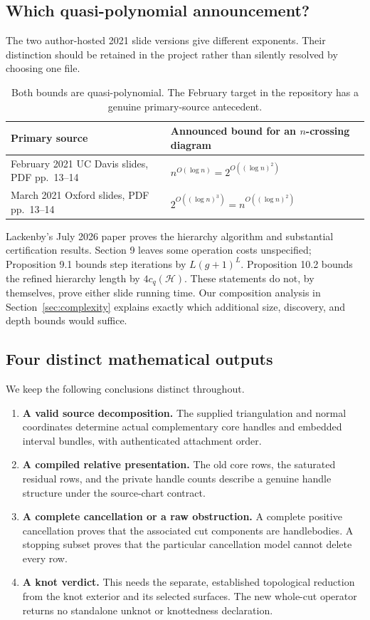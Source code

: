 \subsection{Which quasi-polynomial announcement?}

The two author-hosted 2021 slide versions give different exponents.  Their
distinction should be retained in the project rather than silently resolved
by choosing one file.

\begin{table}[htbp]
\centering\small
\begin{tabularx}{\linewidth}{@{}YX@{}}
\toprule
Primary source & Announced bound for an $n$-crossing diagram\\
\midrule
February 2021 UC Davis slides, PDF pp.\ 13--14\cite{lackenby2021feb}
& $n^{O(\log n)}=2^{O((\log n)^2)}$\\
March 2021 Oxford slides, PDF pp.\ 13--14\cite{lackenby2021mar}
& $2^{O((\log n)^3)}=n^{O((\log n)^2)}$\\
\bottomrule
\end{tabularx}
\caption{Both bounds are quasi-polynomial.  The February target in the
repository has a genuine primary-source antecedent.}
\end{table}

Lackenby's July 2026 paper\cite{lackenby2026} proves the hierarchy algorithm
and substantial certification results.  Section 9 leaves some operation
costs unspecified; Proposition 9.1 bounds step iterations by $L(g+1)^L$.
Proposition 10.2 bounds the refined hierarchy length by $4c_q(\mathcal H)$.
These statements do not, by themselves, prove either slide running time.
Our composition analysis in Section~\ref{sec:complexity} explains exactly
which additional size, discovery, and depth bounds would suffice.

\subsection{Four distinct mathematical outputs}

We keep the following conclusions distinct throughout.
\begin{enumerate}
\item \textbf{A valid source decomposition.}  The supplied triangulation and
normal coordinates determine actual complementary core handles and embedded
interval bundles, with authenticated attachment order.
\item \textbf{A compiled relative presentation.}  The old core rows, the
saturated residual rows, and the private handle counts describe a genuine
handle structure under the source-chart contract.
\item \textbf{A complete cancellation or a raw obstruction.}  A complete
positive cancellation proves that the associated cut components are
handlebodies.  A stopping subset proves that the particular cancellation
model cannot delete every row.
\item \textbf{A knot verdict.}  This needs the separate, established
topological reduction from the knot exterior and its selected surfaces.
The new whole-cut operator returns no standalone unknot or knottedness
declaration.
\end{enumerate}

